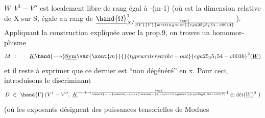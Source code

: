 $\underline{W}\,|V^1-V''$  est  localement libre de rang égal à  -(m-1)  (où  est la
dimension relative de X sur S, égale au rang de $\underline{\hand{\Omega}}^{1}_{X/\var{\over{S}{Y}}{Y}{writing over}{ega25_25_154-v0014}}$).  Appliquant la
construction expliquée avec la prop.9\hand{$^{*}$}, on trouve  un homomor-%
phisme
\[ M\ : \qquad \underline{K} \hand{\longrightarrow} \underline{\mathrm{Sym}}\var{\xout{m}}{}{typewriter strike-out}{ega25_25_154-v0016}^{2}(\underline{W}) \]
et il reste à exprimer que ce dernier est ``non dégénéré'' en x. Pour ceci,
introduisons le  discriminant
\[ D\ \in\ \hand{\Gamma}\,(V^1-V'',\ \underline{K}^{-n+m\var{\over{\unsure{+|-}}{\unsure{-|+}}}{\unsure{-|+}}{writing over}{ega25_25_154-v0017}1}\otimes \text{dét}(\underline{W})^{2}\ ) \]
(où les exposants désignent des puissances tensorielles de Modues

